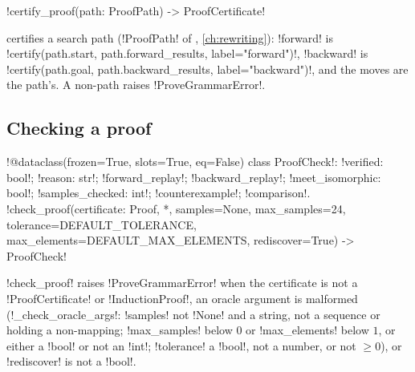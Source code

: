 \begin{signature}
\py!certify_proof(path: ProofPath) -> ProofCertificate!
\end{signature}
certifies a search path (\py!ProofPath! of , \cref{ch:rewriting}): \py!forward! is \py!certify(path.start, path.forward_results, label="forward")!, \py!backward! is \py!certify(path.goal, path.backward_results, label="backward")!, and the moves are the path's. A non-path raises \py!ProveGrammarError!.

\subsection{Checking a proof}

\begin{signature}
\py!@dataclass(frozen=True, slots=True, eq=False) class ProofCheck!: \py!verified: bool!; \py!reason: str!; \py!forward_replay!; \py!backward_replay!; \py!meet_isomorphic: bool!; \py!samples_checked: int!; \py!counterexample!; \py!comparison!.\\
\py!check_proof(certificate: Proof, *, samples=None, max_samples=24, tolerance=DEFAULT_TOLERANCE, max_elements=DEFAULT_MAX_ELEMENTS, rediscover=True) -> ProofCheck!
\end{signature}

\py!check_proof! raises \py!ProveGrammarError! when the certificate is not a \py!ProofCertificate! or \py!InductionProof!, an oracle argument is malformed (\py!_check_oracle_args!: \py!samples! not \py!None! and a string, not a sequence or holding a non-mapping; \py!max_samples! below $0$ or \py!max_elements! below $1$, or either a \py!bool! or not an \py!int!; \py!tolerance! a \py!bool!, not a number, or not $\ge0$), or \py!rediscover! is not a \py!bool!.

